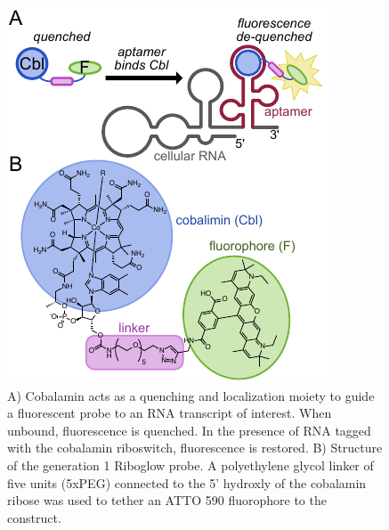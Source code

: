 \begin{figure}
\begin{centering}
\includegraphics[width=\textwidth]{figures/fig1v2.pdf}

\end{centering}
\footnotesize
\caption{\label{figure:riboglow}
A) Cobalamin acts as a quenching and localization moiety to guide a fluorescent probe to an RNA transcript of interest. When unbound, fluorescence is quenched. In the presence of RNA tagged with the cobalamin riboswitch, fluorescence is restored. B) Structure of the generation 1 Riboglow probe. A polyethylene glycol linker of five units (5xPEG) connected to the 5' hydroxly of the cobalamin ribose was used to tether an ATTO 590 fluorophore to the construct.
}
\end{figure}

